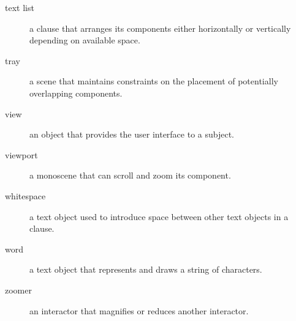\begin{description}
\item [text list] a clause that arranges its components either
horizontally or vertically depending on available space.

\item [tray] a scene that maintains constraints on the
placement of potentially overlapping components.

\item [view] an object that provides the user interface to a subject.

\item [viewport] a monoscene that can scroll and zoom its component.

\item [whitespace] a text object used to introduce space between other
text objects in a clause.

\item [word] a text object that represents and draws a string of characters.

\item [zoomer] an interactor that magnifies or reduces
another interactor.

\end{description}

\clearpage





